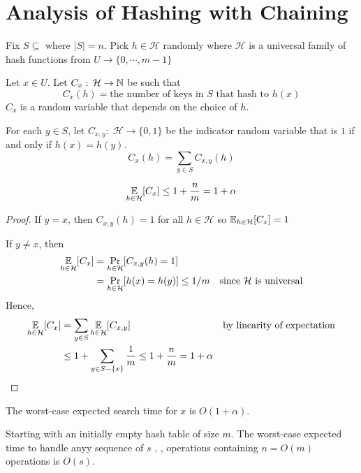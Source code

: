 \section{Analysis of Hashing with Chaining}

Fix $S \subseteq $ where $|S|=n$. Pick $h \in \mathcal{H}$ randomly where $\mathcal{H}$ is a universal family of hash functions from $U \to \{0,\cdots,m-1\}$

Let $x \in U$. Let $C_x:\, \mathcal{H} \to \mathbb{N}$ be such that
$$
C_x(h) = \text{the number of keys in $S$ that hash to $h(x)$}
$$
$C_x$ is a random variable that depends on the choice of $h$.

For each $y \in S$, let $C_{x,y}:\; \mathcal{H} \to \{0,1\}$ be the indicator random variable that is $1$ if and only if $h(x)=h(y)$.
$$
C_x(h) = \sum_{y \in S} C_{x,y}(h)
$$

\begin{theorem}
    $$
    \operatorname*{\mathbb{E}}_{h\in\mathcal{H}}[C_x] \leq 1+\frac{n}{m} = 1 + \alpha
    $$
\end{theorem}

\begin{proof}
    If $y=x$, then $C_{x,y}(h)=1$ for all $h \in \mathcal{H}$ so $\operatorname*{\mathbb{E}}_{h\in\mathcal{H}}[C_x] = 1$

    If $y \neq x$, then
    $$
    \begin{aligned}
        \operatorname*{\mathbb{E}}_{h\in\mathcal{H}}[C_x] &= \Pr_{h\in\mathcal{H}}[C_{x,y}(h) = 1] \\
        &= \Pr_{h\in\mathcal{H}}[h(x)=h(y)] \leq 1/m & \text{since $\mathcal{H}$ is universal}
    \end{aligned}
    $$
    Hence,
    $$
    \begin{aligned}
        \operatorname*{\mathbb{E}}_{h\in\mathcal{H}}[C_x] &= \sum_{y\in S}\operatorname*{\mathbb{E}}_{h\in\mathcal{H}}[C_{x,y}] & \text{by linearity of expectation} \\
        &\leq 1 + \sum_{y \in S-\{x\}} \frac{1}{m} \leq 1 + \frac{n}{m} = 1+\alpha
    \end{aligned}
    $$
\end{proof}

\begin{corollary}
    The worst-case expected search time for $x$ is $O(1+\alpha)$.
\end{corollary}

\begin{corollary}
    Starting with an initially empty hash table of size $m$. The worst-case expected time to handle anyy sequence of $s$ , ,  operations containing $n = O(m)$  operations is $O(s)$.
\end{corollary}

